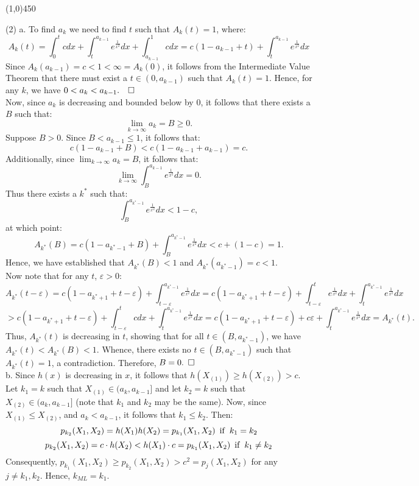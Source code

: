 \documentclass[12pt]{article}
\begin{document}
\begin{center}
\line(1,0){450}
\end{center}

\pagebreak
\noindent
(2) a. To find $a_k$ we need to find $t$ such that $A_k(t) = 1$, where:
$$A_k(t) = \int_{0}^{t} c dx + \int_{t}^{a_{k-1}} e^{\frac{1}{x^2}}dx + \int_{a_{k-1}}^{1} c dx = c(1-a_{k-1}+t)+\int_{t}^{a_{k-1}} e^{\frac{1}{x^2}}dx$$
Since $A_k(a_{k-1}) = c < 1< \infty = A_k(0)$, it follows from the Intermediate Value Theorem that there must exist a $t \in (0,a_{k-1})$ such that $A_k(t) = 1$. Hence, for any $k$, we have $0 < a_k < a_{k-1}. \hspace{10 pt} \square$\\

\noindent
Now, since $a_k$ is decreasing and bounded below by $0$, it follows that there exists a $B$ such that:
$$\lim_{k\to\infty} a_k = B \geq 0.$$ 
Suppose $B>0$. 
Since $B < a_{k-1} \leq 1$, it follows that: 
$$c(1-a_{k-1}+B) < c(1-a_{k-1}+a_{k-1}) = c.$$ 
Additionally, since $\lim_{k\to \infty} a_k = B$, it follows that:
$$\lim_{k\to \infty} \int_{B}^{a_{k-1}}e^{\frac{1}{x^2}}dx = 0.$$ 
Thus there exists a $k^*$ such that: 
$$\int_{B}^{a_{k^*-1}}e^{\frac{1}{x^2}} dx < 1-c,$$ 
at which point:
$$A_{k^*}(B) = c(1-a_{k^*-1}+B) + \int_{B}^{a_{k^*-1}}e^{\frac{1}{x^2}}dx < c +(1-c) = 1.$$
Hence, we have established that $A_{k^*}(B) < 1$ and $A_{k^*}(a_{k^*-1}) = c <1$.\\
Now note that for any $t$, $\varepsilon>0$:
$$A_{k^*}(t-\varepsilon) = c(1-a_{k^*+1}+t-\varepsilon) + \int_{t-\varepsilon}^{a_{k^*-1}}e^{\frac{1}{x^2}}dx
= c(1-a_{k^*+1}+t-\varepsilon) + \int_{t-\varepsilon}^{t}e^{\frac{1}{x^2}}dx +  \int_{t}^{a_{k^*-1}}e^{\frac{1}{x^2}}dx$$
$$> c(1-a_{k^*+1}+t-\varepsilon) + \int_{t-\varepsilon}^{t}c dx +  \int_{t}^{a_{k^*-1}}e^{\frac{1}{x^2}}dx
= c(1-a_{k^*+1}+t-\varepsilon) + c\varepsilon +  \int_{t}^{a_{k^*-1}}e^{\frac{1}{x^2}}dx = A_{k^*}(t).$$
Thus, $A_{k^*}(t)$ is decreasing in $t$, showing that for all $t \in (B,a_{k^*-1})$, we have $A_{k^*}(t) < A_{k^*}(B) < 1$. Whence, there exists no $t \in (B,a_{k^*-1})$ such that $A_{k^*}(t) = 1$, a contradiction.
Therefore, $B=0. \hspace{5 pt} \square$ \\

\noindent
b. Since $h(x)$ is decreasing in $x$, it follows that $h(X_{(1)}) \geq h(X_{(2)}) > c$. Let $k_1 = k$ such that $X_{(1)} \in (a_k,a_{k-1}]$ and let $k_2 = k$ such that $X_{(2)} \in (a_k,a_{k-1}]$ (note that $k_1$ and $k_2$ may be the same). Now, since $X_{(1)} \leq X_{(2)}$, and $a_k < a_{k-1}$, it follows that $k_1 \leq k_2$. Then:
$$p_{k_2}(X_1,X_2) = h(X_1)h(X_2) = p_{k_1}(X_1,X_2) \hspace{5 pt} {\rm if} \hspace{5 pt} k_1 = k_2 $$
$$p_{k_2}(X_1,X_2) = c \cdot h(X_2) < h(X_1) \cdot c = p_{k_1}(X_1,X_2) \hspace{5 pt} {\rm if} \hspace{5 pt} k_1 \neq k_2 $$
Consequently, $p_{k_1}(X_1,X_2) \geq p_{k_2}(X_1,X_2) > c^2 = p_{j}(X_1,X_2)$ for any $j \neq k_1,k_2$. Hence, $k_{ML} = k_1$.\\ 
\end{document}
